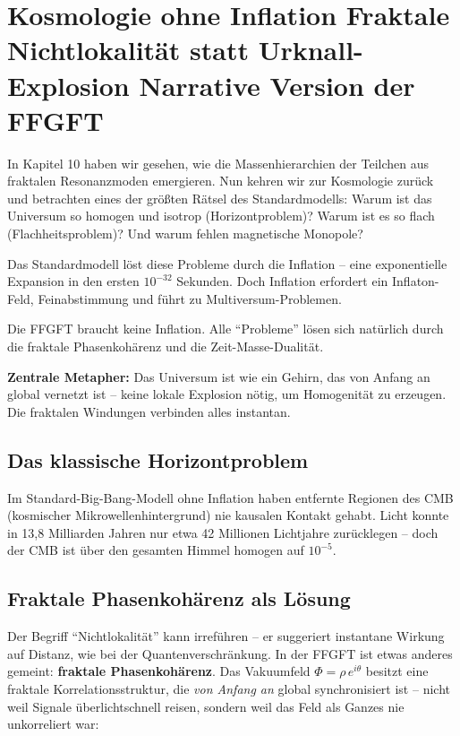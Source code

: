 \chapter{Kosmologie ohne Inflation  Fraktale Nichtlokalität statt Urknall-Explosion  Narrative Version der FFGFT}


	
	In Kapitel 10 haben wir gesehen, wie die Massenhierarchien der Teilchen aus fraktalen Resonanzmoden emergieren. Nun kehren wir zur Kosmologie zurück und betrachten eines der größten Rätsel des Standardmodells: Warum ist das Universum so homogen und isotrop (Horizontproblem)? Warum ist es so flach (Flachheitsproblem)? Und warum fehlen magnetische Monopole?
	
	Das Standardmodell löst diese Probleme durch die Inflation – eine exponentielle Expansion in den ersten \(10^{-32}\) Sekunden. Doch Inflation erfordert ein Inflaton-Feld, Feinabstimmung und führt zu Multiversum-Problemen.
	
	Die FFGFT braucht keine Inflation. Alle \enquote{Probleme} lösen sich natürlich durch die fraktale Phasenkohärenz und die Zeit-Masse-Dualität.
	
	\textbf{Zentrale Metapher:} Das Universum ist wie ein Gehirn, das von Anfang an global vernetzt ist – keine lokale Explosion nötig, um Homogenität zu erzeugen. Die fraktalen Windungen verbinden alles instantan.
	
	\section{Das klassische Horizontproblem}
	
	Im Standard-Big-Bang-Modell ohne Inflation haben entfernte Regionen des CMB (kosmischer Mikrowellenhintergrund) nie kausalen Kontakt gehabt. Licht konnte in 13,8 Milliarden Jahren nur etwa 42 Millionen Lichtjahre zurücklegen – doch der CMB ist über den gesamten Himmel homogen auf \(10^{-5}\).
	
	\section{Fraktale Phasenkohärenz als Lösung}
	
	Der Begriff \enquote{Nichtlokalität} kann irreführen -- er suggeriert instantane Wirkung auf Distanz, wie bei der Quantenverschränkung. In der FFGFT ist etwas anderes gemeint: \textbf{fraktale Phasenkohärenz}. Das Vakuumfeld $\Phi = \rho\, e^{i\theta}$ besitzt eine fraktale Korrelationsstruktur, die \textit{von Anfang an} global synchronisiert ist -- nicht weil Signale überlichtschnell reisen, sondern weil das Feld als Ganzes nie unkorreliert war:
	

